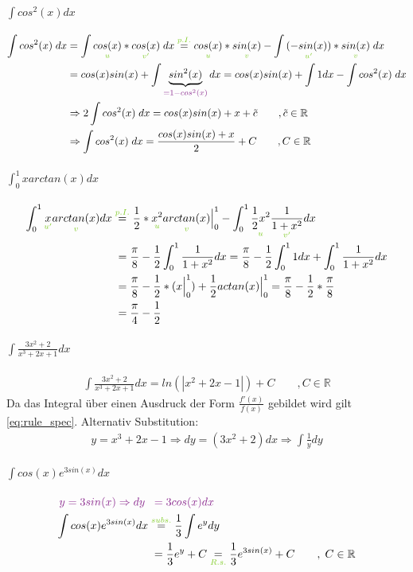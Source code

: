 \documentclass[12pt,a4paper]{article}%
\numberwithin{equation}{section}
\newcommand{\R}{\mathbb{R}} %
\newcommand{\subsubsubsection}{\paragraph}
\def\colBord#1{\begingroup\color{Fuchsia}{#1}\endgroup}
\def\colGreen#1{\begingroup\color{LimeGreen}{#1}\endgroup}
\def\usGreen#1#2{\underset{\colGreen{#1}}{#2}}
\numberwithin{equation}{subsection}
\begin{document}
		\subsubsubsection{$\int cos^2(x)dx$}
		\begin{align}
			\int cos^2(x)\;dx &= \int \usGreen{u}{cos(x)} * \usGreen{v'}{cos(x)}\;dx \overset{\colGreen{p.I.}}{=}
			\usGreen{u}{cos(x)} * \usGreen{v}{sin(x)} - \int \usGreen{u'}{(-sin(x))}*\usGreen{v}{sin(x)}\;dx \nonumber\\
			&=cos(x)sin(x) + \int \underbrace{sin^2(x)}_{\colBord{= 1-cos^2(x)}}dx = cos(x)sin(x) + \int 1dx - \int cos^2(x)\; dx \nonumber\\
			&\Rightarrow 2\int cos^2(x)\;dx = cos(x)sin(x) + x + \tilde{c} \qquad ,\tilde{c}\in\R\nonumber\\
			&\Rightarrow \int cos^2(x)\;dx = \frac{cos(x)sin(x)+x}{2}+C \qquad, C\in\R \label{eq:ex3}
		\end{align}
		
		\subsubsubsection{$\int_0^1 x arctan(x) dx$}
		\begin{align}
			\int_0^1 \usGreen{u'}{x} \usGreen{v}{arctan(x)} dx &\overset{\colGreen{p.I.}}{=} 
			\frac{1}{2} * \usGreen{u}{x^2} \usGreen{v}{arctan(x)} \Big|_0^1 - 
			\int_0^1 \usGreen{u}{\frac{1}{2} x^2} \usGreen{v'}{\frac{1}{1+x^2}}dx \nonumber\\
			&\;= \frac{\pi}{8} - \frac{1}{2} \int_0^1 \frac{1}{1+x^2} dx 
			= \frac{\pi}{8} - \frac{1}{2} \int_0^1 1 dx + \int_0^1 \frac{1}{1+x^2} dx \nonumber\\
			&\;= \frac{\pi}{8} - \frac{1}{2}* (x\Big|_0^1) + \frac{1}{2} actan(x)\Big|_0^1 
			= \frac{\pi}{8} - \frac{1}{2} * \frac{\pi}{8} \nonumber\\
			&\;= \frac{\pi}{4} - \frac{1}{2} \label{eq:ex4}
		\end{align}
		
		\subsubsubsection{$\int \frac{3x^2+2}{x^3+2x+1}dx$}
		\begin{align}
		  \int \frac{3x^2+2}{x^3+2x+1}dx = ln(|x^2+2x-1|) + C \qquad ,C\in\R\label{eq:ex5}
		\end{align}
		Da das Integral über einen Ausdruck der Form $\frac{f'(x)}{f(x)}$ gebildet wird gilt \eqref{eq:rule_spec}. Alternativ Substitution:
		\begin{align*}
		  y = x^3+2x-1 \Rightarrow dy = (3x^2+2) dx \Rightarrow \int \frac{1}{y}dy
		\end{align*}
		
		\subsubsubsection{$\int cos(x) e^{3sin(x)}dx$}
		\begin{align}
			\colBord{y = 3sin(x) \Rightarrow dy}\; &\;\;\colBord{=} \; \colBord{3cos(x) dx} \nonumber\\
			\int cos(x) e^{3sin(x)}dx &\overset{\colGreen{subs.}}{=} \frac{1}{3} \int e^y dy \nonumber\\
			&\;= \frac{1}{3} e^y + C \usGreen{R.s.}{=} \frac{1}{3}e^{3sin(x)} + C \qquad , \; C\in\R
		\end{align}
		
\end{document}
